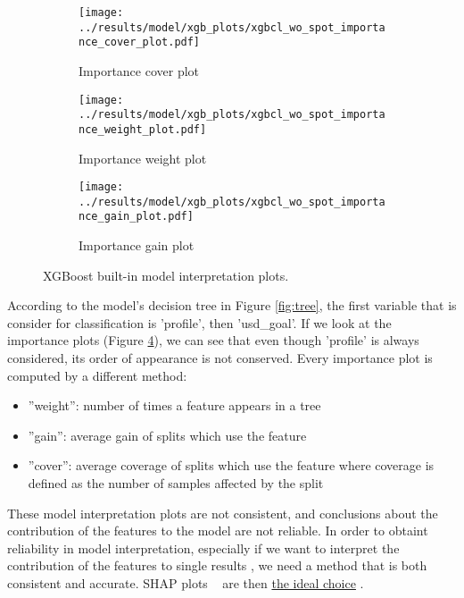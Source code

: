 \documentclass{article}
\begin{document}
{\begin{itemize}
\begin{figure}

  \begin{subfigure}[a]{0.5\linewidth}
    \centering\texttt{[image: ../results/model/xgb\_plots/xgbcl\_wo\_spot\_importance\_cover\_plot.pdf]}
    \caption{Importance cover plot}
    \label{fig:cover}
  \end{subfigure}
 
  \begin{subfigure}[b]{0.5\linewidth}
    \centering\texttt{[image: ../results/model/xgb\_plots/xgbcl\_wo\_spot\_importance\_weight\_plot.pdf]}
    \caption{Importance weight plot}
    \label{fig:weight}
  \end{subfigure}
  
   \begin{subfigure}[c]{0.5\linewidth}
    \centering\texttt{[image: ../results/model/xgb\_plots/xgbcl\_wo\_spot\_importance\_gain\_plot.pdf]}
    \caption{Importance gain plot}
    \label{fig:gain}
  \end{subfigure}
\caption{XGBoost built-in model interpretation plots.}
\label{fig:xgb_int}
\end{figure}

According to the model's decision tree in Figure \ref{fig:tree}, the first variable that is consider for classification is 'profile', then 'usd\_goal'. If we look at the importance plots (Figure \ref{fig:xgb_int}), we can see that even though 'profile' is always considered, its order of appearance is not conserved. Every importance plot is computed by a different method:
\begin{itemize}

\item ”weight”: number of times a feature appears in a tree

\item ”gain”: average gain of splits which use the feature

\item ”cover”: average coverage of splits which use the feature where coverage is defined as the number of samples affected by the split
\end{itemize}

These model interpretation plots are not consistent, and conclusions about the contribution of the features to the model are not reliable. In order to obtaint reliability in model interpretation, especially if we want to interpret the contribution of the features to single results , we need a method that is both consistent and accurate. SHAP plots ~\cite{DBLP:journals/corr/LundbergL17, lundberg2020local2global} are then \href{https://towardsdatascience.com/interpretable-machine-learning-with-xgboost-9ec80d148d27}{the ideal choice} .


\end{itemize}}
\end{document}
